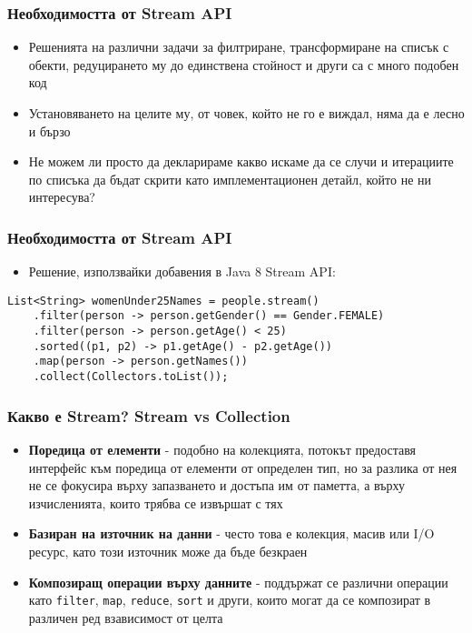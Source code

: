\documentclass[ignorenonframetext, hyperref=unicode,compress,pdflatex]{beamer}
\begin{document}
\begin{frame}[containsverbatim]\frametitle{Необходимостта от Stream API}
\begin{itemize}
  \item Решенията на различни задачи за филтриране, трансформиране на списък с
  обекти, редуцирането му до единствена стойност и други са с много подобен код
  \item Установяването на целите му, от човек, който не го е виждал, няма да е
  лесно и бързо
  \item Не можем ли просто да декларираме какво искаме да се случи и итерациите
  по списъка да бъдат скрити като имплементационен детайл, който не ни
  интересува?
\end{itemize}
\end{frame}

\begin{frame}[containsverbatim]\frametitle{Необходимостта от Stream API}
\begin{itemize}
  \item Решение, използвайки добавения в Java 8 Stream API:
\end{itemize}
\begin{lstlisting}
List<String> womenUnder25Names = people.stream()
	.filter(person -> person.getGender() == Gender.FEMALE)
	.filter(person -> person.getAge() < 25)
	.sorted((p1, p2) -> p1.getAge() - p2.getAge())
	.map(person -> person.getNames())
	.collect(Collectors.toList());
\end{lstlisting}
\end{frame}

\begin{frame}[containsverbatim]\frametitle{Какво е Stream? Stream vs Collection}
\begin{itemize}
  \item \textbf{Поредица от елементи} - подобно на колекцията, потокът
  предоставя интерфейс към поредица от елементи от определен тип, но за
  разлика от нея не се фокусира върху запазването и достъпа им от паметта, а
  върху изчисленията, които трябва се извършат с тях
  \item \textbf{Базиран на източник на данни} - често това е колекция, масив или
  I/O ресурс, като този източник може да бъде безкраен
  \item \textbf{Композиращ операции върху данните} - поддържат се различни
  операции като \lstinline{filter}, \lstinline{map}, \lstinline{reduce},
  \lstinline{sort} и други, които могат да се композират в различен ред
  взависимост от целта
\end{itemize}
\end{frame}
\end{document}
